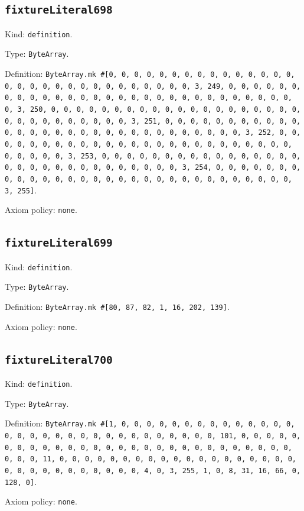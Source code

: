 \documentclass[11pt]{article}
\begin{document}
\subsection*{\texttt{fixtureLiteral698}}
\noindent Kind: \texttt{definition}.\par
\noindent Type: \texttt{ByteArray}.\par
\noindent Definition: \texttt{ByteArray.mk \#[0, 0, 0, 0, 0, 0, 0, 0, 0, 0, 0, 0, 0, 0, 0, 0, 0, 0, 0, 0, 0, 0, 0, 0, 0, 0, 0, 0, 0, 0, 3, 249, 0, 0, 0, 0, 0, 0, 0, 0, 0, 0, 0, 0, 0, 0, 0, 0, 0, 0, 0, 0, 0, 0, 0, 0, 0, 0, 0, 0, 0, 0, 3, 250, 0, 0, 0, 0, 0, 0, 0, 0, 0, 0, 0, 0, 0, 0, 0, 0, 0, 0, 0, 0, 0, 0, 0, 0, 0, 0, 0, 0, 0, 0, 3, 251, 0, 0, 0, 0, 0, 0, 0, 0, 0, 0, 0, 0, 0, 0, 0, 0, 0, 0, 0, 0, 0, 0, 0, 0, 0, 0, 0, 0, 0, 0, 3, 252, 0, 0, 0, 0, 0, 0, 0, 0, 0, 0, 0, 0, 0, 0, 0, 0, 0, 0, 0, 0, 0, 0, 0, 0, 0, 0, 0, 0, 0, 0, 3, 253, 0, 0, 0, 0, 0, 0, 0, 0, 0, 0, 0, 0, 0, 0, 0, 0, 0, 0, 0, 0, 0, 0, 0, 0, 0, 0, 0, 0, 0, 0, 3, 254, 0, 0, 0, 0, 0, 0, 0, 0, 0, 0, 0, 0, 0, 0, 0, 0, 0, 0, 0, 0, 0, 0, 0, 0, 0, 0, 0, 0, 0, 0, 3, 255]}.\par
\noindent Axiom policy: \texttt{none}.\par
\subsection*{\texttt{fixtureLiteral699}}
\noindent Kind: \texttt{definition}.\par
\noindent Type: \texttt{ByteArray}.\par
\noindent Definition: \texttt{ByteArray.mk \#[80, 87, 82, 1, 16, 202, 139]}.\par
\noindent Axiom policy: \texttt{none}.\par
\subsection*{\texttt{fixtureLiteral700}}
\noindent Kind: \texttt{definition}.\par
\noindent Type: \texttt{ByteArray}.\par
\noindent Definition: \texttt{ByteArray.mk \#[1, 0, 0, 0, 0, 0, 0, 0, 0, 0, 0, 0, 0, 0, 0, 0, 0, 0, 0, 0, 0, 0, 0, 0, 0, 0, 0, 0, 0, 0, 0, 0, 101, 0, 0, 0, 0, 0, 0, 0, 0, 0, 0, 0, 0, 0, 0, 0, 0, 0, 0, 0, 0, 0, 0, 0, 0, 0, 0, 0, 0, 0, 0, 0, 11, 0, 0, 0, 0, 0, 0, 0, 0, 0, 0, 0, 0, 0, 0, 0, 0, 0, 0, 0, 0, 0, 0, 0, 0, 0, 0, 0, 0, 0, 0, 4, 0, 3, 255, 1, 0, 8, 31, 16, 66, 0, 128, 0]}.\par
\noindent Axiom policy: \texttt{none}.\par
\end{document}
